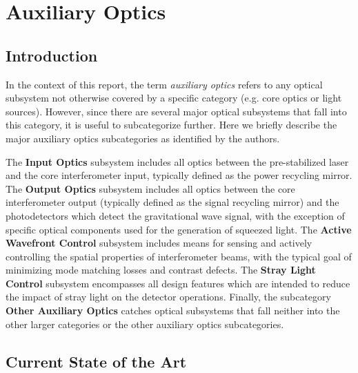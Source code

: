 \section{Auxiliary Optics}
\label{sec:Aux-optics}

\subsection{Introduction}
In the context of this report, the term \emph{auxiliary optics} refers to any optical subsystem not otherwise covered by a specific category (e.g. core optics or light sources). However, since there are several major optical subsystems that fall into this category, it is useful to subcategorize further. Here we briefly describe the major auxiliary optics subcategories as identified by the authors. 

The {\bf Input Optics} subsystem includes all optics between the pre-stabilized laser and the core interferometer input, typically defined as the power recycling mirror. The {\bf Output Optics} subsystem includes all optics between the core interferometer output (typically defined as the signal recycling mirror) and the photodetectors which detect the gravitational wave signal, with the exception of specific optical components used for the generation of squeezed light. The {\bf Active Wavefront Control} subsystem includes means for sensing and actively controlling the spatial properties of interferometer beams, with the typical goal of minimizing mode matching losses and contrast defects. The {\bf Stray Light Control} subsystem encompasses all design features which are intended to reduce the impact of stray light on the detector operations. Finally, the subcategory {\bf Other Auxiliary Optics} catches optical subsystems that fall neither into the other larger categories or the other auxiliary optics subcategories.

\subsection{Current State of the Art}
